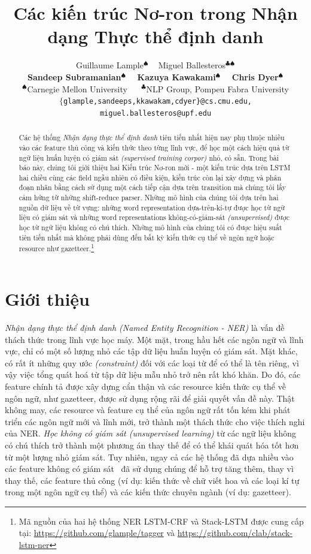 \documentclass[11pt,letterpaper]{article}
\title{Các kiến trúc Nơ-ron trong Nhận dạng Thực thể định danh
\Thanks{Bản dịch của bài báo khoa học 
\textbf{Neural Architectures for Named Entity Recognition}
\textit{(https://arxiv.org/abs/1603.01360)} 
thực hiện bởi Phạm Hữu Danh, sinh viên lớp KTPM2014, khoa Công nghệ Phần mềm,
trường Đại học Công nghệ thông tin, Đại học Quốc gia Thành phố Hồ Chí Minh.}}
\author{Guillaume Lample$^{\spadesuit}$ ~ Miguel Ballesteros$^{\clubsuit\spadesuit}$ \\ 
  \textbf{Sandeep Subramanian$^{\spadesuit}$ ~ Kazuya Kawakami$^\spadesuit$ ~ Chris Dyer$^{\spadesuit}$}\\
  $^\spadesuit$Carnegie Mellon University ~~ $^\clubsuit$NLP Group, Pompeu Fabra University \\
  {\tt $\{$glample,sandeeps,kkawakam,cdyer\}@cs.cmu.edu,} \\
  { \tt miguel.ballesteros@upf.edu}}
\date{}
\begin{document}
\maketitle

\begin{abstract}
Các hệ thống \textit{Nhận dạng thực thể định danh} tiên tiến nhất hiện nay phụ thuộc nhiều vào các feature thủ công và kiến thức theo từng lĩnh vực, để học một cách hiệu quả từ ngữ liệu huấn luyện có giám sát \textit{(supervised training corpor)} nhỏ, có sẵn. 
Trong bài báo này, chúng tôi giới thiệu hai Kiến trúc Nơ-ron mới - một kiến trúc dựa trên LSTM hai chiều cùng các field ngẫu nhiên có điều kiện, kiến trúc còn lại xây dựng và phân đoạn nhãn bằng cách sử dụng một cách tiếp cận dựa trên transition mà chúng tôi lấy cảm hứng từ những shift-reduce parser. 
Những mô hình của chúng tôi dựa trên hai nguồn dữ liệu về từ vựng: những word representation dựa-trên-kí-tự được học từ ngữ liệu có giám sát và những word representations không-có-giám-sát \textit{(unsupervised)} được học từ ngữ liệu không có chú thích.
Những mô hình của chúng tôi có được hiệu suất tiên tiến nhất mà không phải dùng đến bất kỳ kiến thức cụ thể về ngôn ngữ hoặc resource như gazetteer.\footnote{Mã nguồn của hai hệ thống NER LSTM-CRF và Stack-LSTM được cung cấp tại: \url{https://github.com/glample/tagger} và \url{https://github.com/clab/stack-lstm-ner}}
\end{abstract}

\section{Giới thiệu}
\textit{Nhận dạng thực thể định danh (Named Entity Recognition - NER)} là vấn đề thách thức trong lĩnh vực học máy. 
Một mặt, trong hầu hết các ngôn ngữ và lĩnh vực, chỉ có một số lượng nhỏ các tập dữ liệu huấn luyện có giám sát. 
Mặt khác, có rất ít những quy ước \textit{(constraint)} đối với các loại từ để có thể là tên riêng, vì vậy việc tổng quát hoá từ tập dữ liệu mẫu nhỏ trở nên rất khó khăn.
Do đó, các feature chính tả được xây dựng cẩn thận và các resource kiến thức cụ thể về ngôn ngữ, như gazetteer, được sử dụng rộng rãi để giải quyết vấn đề này. 
Thật không may, các resource và feature cụ thể của ngôn ngữ rất tốn kém khi phát triển các ngôn ngữ mới và lĩnh mới, trở thành một thách thức cho việc thích nghi của NER. 
\textit{Học không có giám sát (unsupervised learning)} từ các ngữ liệu không có chú thích trở thành một phương án thay thế để có thể khái quát hóa tốt hơn từ một lượng nhỏ giám sát. 
Tuy nhiên, ngay cả các hệ thống đã dựa nhiều vào các feature không có giám sát~\cite[\emph{inter alia}]{collobert2011natural,turian:2010,lin2009phrase,ando:2005} đã sử dụng chúng để hỗ trợ tăng thêm, thay vì thay thế, các feature thủ công (ví dụ: kiến thức về chữ viết hoa và các loại kí tự trong một ngôn ngữ cụ thể) và các kiến thức chuyên ngành (ví dụ: gazetteer).
\end{document}
